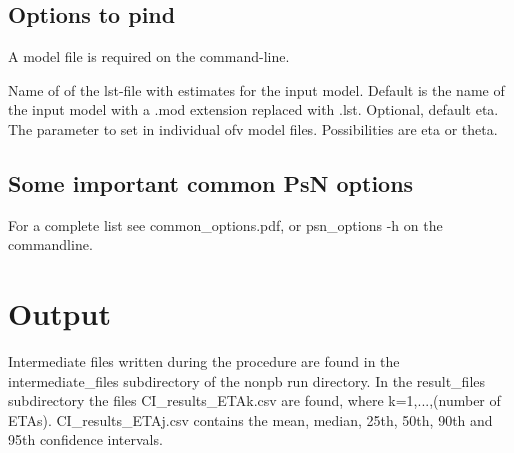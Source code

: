 \subsection{Options to pind}
A model file is required on the command-line.
\begin{optionlist}
Name of  of the lst-file with estimates for the input model. Default is the name of the input model with a .mod extension replaced with .lst. 
\nextopt
{}
Optional, default eta. The parameter to set in individual ofv model files. Possibilities are eta or theta. 
\nextopt
\end{optionlist}

\subsection{Some important common PsN options}
For a complete list see common\_options.pdf, 
or psn\_options -h on the commandline.



\section{Output}
Intermediate files written during the procedure are found in the intermediate\_files subdirectory of the nonpb run directory. In the result\_files subdirectory the files CI\_results\_ETAk.csv are found, where k=1,...,(number of ETAs). CI\_results\_ETAj.csv contains the mean, median, 25th, 50th, 90th and 95th confidence intervals.

